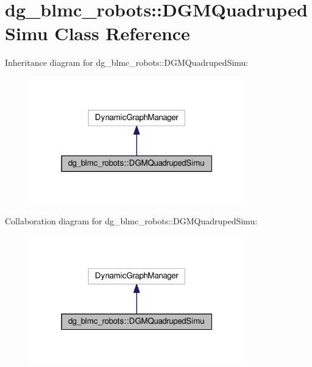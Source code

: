 \hypertarget{classdg__blmc__robots_1_1DGMQuadrupedSimu}{}\section{dg\+\_\+blmc\+\_\+robots\+:\+:D\+G\+M\+Quadruped\+Simu Class Reference}
\label{classdg__blmc__robots_1_1DGMQuadrupedSimu}


Inheritance diagram for dg\+\_\+blmc\+\_\+robots\+:\+:D\+G\+M\+Quadruped\+Simu\+:
\nopagebreak
\begin{figure}[H]
\begin{center}
\leavevmode
\includegraphics[width=265pt]{classdg__blmc__robots_1_1DGMQuadrupedSimu__inherit__graph}
\end{center}
\end{figure}


Collaboration diagram for dg\+\_\+blmc\+\_\+robots\+:\+:D\+G\+M\+Quadruped\+Simu\+:
\nopagebreak
\begin{figure}[H]
\begin{center}
\leavevmode
\includegraphics[width=265pt]{classdg__blmc__robots_1_1DGMQuadrupedSimu__coll__graph}
\end{center}
\end{figure}
